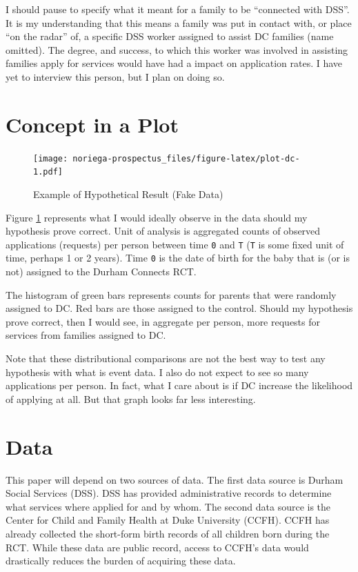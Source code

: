 \documentclass[12pt,letterpaperpaper,]{book}
\begin{document}
I should pause to specify what it meant for a family to be ``connected
with DSS''. It is my understanding that this means a family was put in
contact with, or place ``on the radar'' of, a specific DSS worker
assigned to assist DC families (name omitted). The degree, and success,
to which this worker was involved in assisting families apply for
services would have had a impact on application rates. I have yet to
interview this person, but I plan on doing so.

\newpage

\section*{Concept in a Plot}\label{concept-in-a-plot-1}

\begin{figure}
\centering
\texttt{[image: noriega-prospectus\_files/figure-latex/plot-dc-1.pdf]}
\caption{\label{fig:plot-dc}Example of Hypothetical Result (Fake Data)}
\end{figure}

Figure \ref{fig:plot-dc} represents what I would ideally observe in the
data should my hypothesis prove correct. Unit of analysis is aggregated
counts of observed applications (requests) per person between time
\texttt{0} and \texttt{T} (\texttt{T} is some fixed unit of time,
perhaps 1 or 2 years). Time \texttt{0} is the date of birth for the baby
that is (or is not) assigned to the Durham Connects RCT.

The histogram of green bars represents counts for parents that were
randomly assigned to DC. Red bars are those assigned to the control.
Should my hypothesis prove correct, then I would see, in aggregate per
person, more requests for services from families assigned to DC.

Note that these distributional comparisons are not the best way to test
any hypothesis with what is event data. I also do not expect to see so
many applications per person. In fact, what I care about is if DC
increase the likelihood of applying at all. But that graph looks far
less interesting.

\newpage

\section*{Data}\label{data-2}

This paper will depend on two sources of data. The first data source is
Durham Social Services (DSS). DSS has provided administrative records to
determine what services where applied for and by whom. The second data
source is the Center for Child and Family Health at Duke University
(CCFH). CCFH has already collected the short-form birth records of all
children born during the RCT. While these data are public record, access
to CCFH's data would drastically reduces the burden of acquiring these
data.
\end{document}
